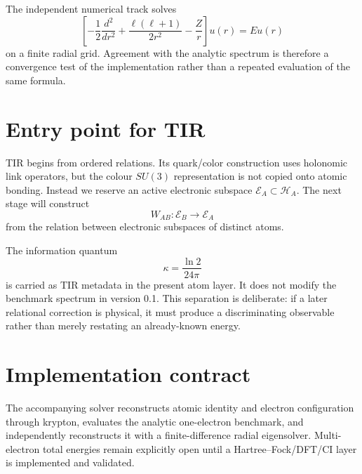 The independent numerical track solves
\begin{equation}
\left[-\frac12\frac{d^2}{dr^2}+\frac{\ell(\ell+1)}{2r^2}-\frac{Z}{r}\right]u(r)=Eu(r)
\end{equation}
on a finite radial grid. Agreement with the analytic spectrum is therefore a convergence test of the implementation rather than a repeated evaluation of the same formula.

\section{Entry point for TIR}
TIR begins from ordered relations. Its quark/color construction uses holonomic link operators, but the colour $SU(3)$ representation is not copied onto atomic bonding. Instead we reserve an active electronic subspace $\mathcal E_A\subset\mathcal H_A$. The next stage will construct
\begin{equation}
W_{AB}:\mathcal E_B\rightarrow\mathcal E_A
\end{equation}
from the relation between electronic subspaces of distinct atoms.

The information quantum
\begin{equation}
\kappa=\frac{\ln 2}{24\pi}
\end{equation}
is carried as TIR metadata in the present atom layer. It does not modify the benchmark spectrum in version 0.1. This separation is deliberate: if a later relational correction is physical, it must produce a discriminating observable rather than merely restating an already-known energy.

\section{Implementation contract}
The accompanying solver reconstructs atomic identity and electron configuration through krypton, evaluates the analytic one-electron benchmark, and independently reconstructs it with a finite-difference radial eigensolver. Multi-electron total energies remain explicitly open until a Hartree--Fock/DFT/CI layer is implemented and validated.
